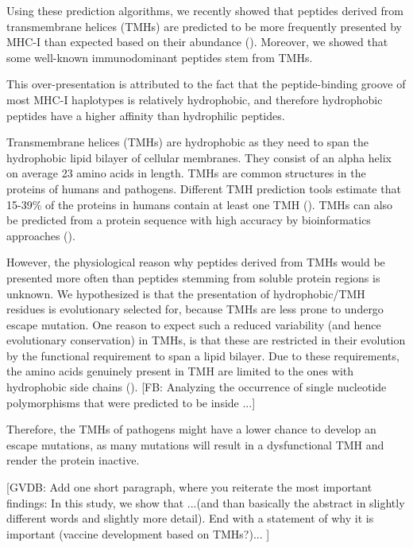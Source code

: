 
Using these prediction algorithms, 
we recently showed that peptides derived 
from transmembrane helices (TMHs) 
are predicted to be more frequently presented by MHC-I 
than expected based on their abundance (\cite{bianchi2017}). 
Moreover, we showed that some well-known immunodominant peptides stem from TMHs. 

This over-presentation is attributed to the fact 
that the peptide-binding groove of most MHC-I haplotypes 
is relatively hydrophobic, 
and therefore hydrophobic peptides have a higher affinity 
than hydrophilic peptides. 

Transmembrane helices (TMHs) are hydrophobic 
as they need to span the hydrophobic lipid bilayer of cellular membranes.
They consist of an alpha helix on average 23 amino acids in length. 
TMHs are common structures in the proteins of humans and pathogens. 
Different TMH prediction tools estimate
that 15-39\% of the proteins in humans 
contain at least one TMH (\cite{ahram2006estimation}).
TMHs can also be predicted from a protein sequence 
with high accuracy by bioinformatics approaches (\cite{krogh2001predicting,bianchi2017,kall2004combined,arai2004conpred,jones2007improving,klammer2009metatm,wang2019efficient}).

However, the physiological reason why peptides derived from TMHs 
would be presented more often than peptides 
stemming from soluble protein regions is unknown. 
We hypothesized is that the presentation of 
hydrophobic/TMH residues is evolutionary selected for, 
because TMHs are less prone to undergo escape mutation. 
One reason to expect such a reduced 
variability (and hence evolutionary conservation) in TMHs, 
is that these are restricted in their evolution 
by the functional requirement to span a lipid bilayer. 
Due to these requirements, 
the amino acids genuinely present in TMH 
are limited to the ones with hydrophobic side chains (\cite{jones1994model}).
[FB: Analyzing the occurrence of single nucleotide polymorphisms 
that were predicted to be inside ...]

Therefore, the TMHs of pathogens 
might have a lower chance to develop an escape mutations, 
as many mutations will result in a dysfunctional TMH 
and render the protein inactive.

[GVDB:
 Add one short paragraph, 
 where you reiterate the most important findings:
 In this study, we show that ...(and than basically 
 the abstract in slightly different words and slightly 
 more detail). End with a statement of why it is 
 important (vaccine development based on TMHs?)...
]

